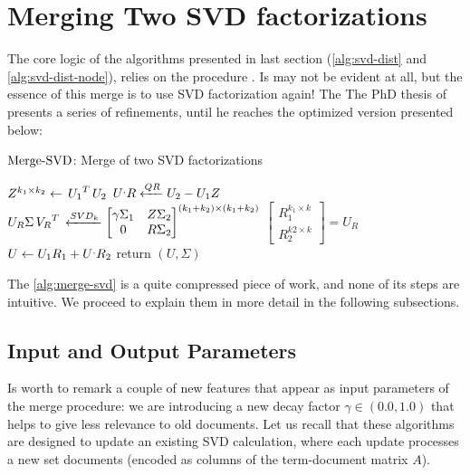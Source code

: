 \section{Merging Two SVD factorizations}

The core logic of the algorithms presented in last section
(\cref{alg:svd-dist} and \cref{alg:svd-dist-node}), relies on the
procedure . Is may not be evident at all, but the
essence of this merge is to use SVD factorization again! The The PhD
thesis of \Rehurek presents a series of refinements, until he reaches
the optimized version presented below: \\

\begin{algorithm}
  \label{alg:merge-svd}
  \caption{$\operatorname{Merge-SVD}$: Merge of two SVD factorizations}
%
  \DontPrintSemicolon
%
%
%
  $Z^{k_1 \times k_2} \gets \,{U_1}^{T}\,U_2$ \;
%
  $\prim{U} R \xleftarrow{QR} U_2 - U_1 Z$ \;
%
  $U_R \Sigma\,{V_R}^{T}\, \xleftarrow{SVD_k}
    \begin{bmatrix}
      \gamma\Sigma_1 & Z \Sigma_2 \\
      0 & R\Sigma_2
    \end{bmatrix}^{(k_1 + k_2) \times (k_1 + k_2)}$ \;
%
  $\begin{bmatrix}
      R_1^{k_1 \times k} \\
      R_2^{k2 \times k}
    \end{bmatrix} = U_R$ \;
%
  $U \gets U_1R_1 + \prim{U}R_2$ \;
%
  return $(U,\Sigma)$ \;
\end{algorithm}
\hfill

The \cref{alg:merge-svd} is a quite compressed piece of work, and none
of its steps are intuitive. We proceed to explain them in more detail
in the following subsections.

\subsection{Input and Output Parameters}

Is worth to remark a couple of new features that appear as input
parameters of the merge procedure: we are introducing a new decay
factor $\gamma \in (0.0,1.0)$ that helps to give less relevance to old
documents. Let us recall that these algorithms are designed to update
an existing SVD calculation, where each update processes a new set
documents (encoded as columns of the term-document matrix $A$). \\

